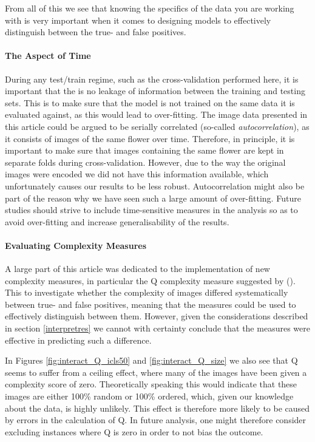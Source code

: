 \documentclass[12pt]{article}
\begin{document}
From all of this we see that knowing the specifics of the data you are working with is very important when it comes to designing models to effectively distinguish between the true- and false positives.

\paragraph{The Aspect of Time}
During any test/train regime, such as the cross-validation performed here, it is important that the is no leakage of information between the training and testing sets. This is to make sure that the model is not trained on the same data it is evaluated against, as this would lead to over-fitting. The image data presented in this article could be argued to be serially correlated (so-called \textit{autocorrelation}), as it consists of images of the same flower over time. Therefore, in principle, it is important to make sure that images containing the same flower are kept in separate folds during cross-validation. However, due to the way the original images were encoded we did not have this information available, which unfortunately causes our results to be less robust. Autocorrelation might also be part of the reason why we have seen such a large amount of over-fitting. Future studies should strive to include time-sensitive measures in the analysis so as to avoid over-fitting and increase generalisability of the results.

\paragraph{Evaluating Complexity Measures}
A large part of this article was dedicated to the implementation of new complexity measures, in particular the Q complexity measure suggested by (\cite{zanetteQuantifyingComplexityBlackandwhite2018}). This to investigate whether the complexity of images differed systematically between true- and false positives, meaning that the measures could be used to effectively distinguish between them. However, given the considerations described in section \ref{interpretres} we cannot with certainty conclude that the measures were effective in predicting such a difference.

In Figures \ref{fig:interact_Q_icls50} and \ref{fig:interact_Q_size} we also see that Q seems to suffer from a ceiling effect, where many of the images have been given a complexity score of zero. Theoretically speaking this would indicate that these images are either 100\% random or 100\% ordered, which, given our knowledge about the data, is highly unlikely. This effect is therefore more likely to be caused by errors in the calculation of Q. In future analysis, one might therefore consider excluding instances where Q is zero in order to not bias the outcome.
\end{document}
